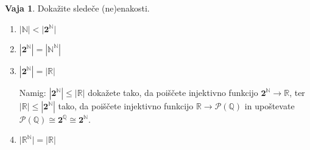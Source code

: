 \documentclass{article}
\newcommand{\pow}{\mathcal{P}}
\newcommand{\NN}{\mathbb{N}}
\newcommand{\QQ}{\mathbb{Q}}
\newcommand{\RR}{\mathbb{R}}
\newcommand{\two}{\mathtt{\mathbf{2}}}
\theoremstyle{definition}
\newtheorem{vaja}{Vaja}
\begin{document}
\begin{vaja}
  Dokažite sledeče (ne)enakosti.
  \begin{enumerate}
    \item
      $|\NN| < \big|\two^\NN\big|$
    \item
      $|\two^\NN| = |\NN^\NN|$
    \item
      $|\two^\NN| = |\RR|$
      
      \smallskip
      {\small Namig: $|\two^\NN| \leq |\RR|$ dokažete tako, da poiščete injektivno funkcijo $\two^\NN \to \RR$, ter $|\RR| \leq |\two^\NN|$ tako, da poiščete injektivno funkcijo $\RR \to \pow(\QQ)$ in upoštevate $\pow(\QQ) \cong \two^\QQ \cong \two^\NN$.}
    \item
      $ \big|\RR^\NN\big| = |\RR|$
  \end{enumerate}
\end{vaja}
\end{document}
